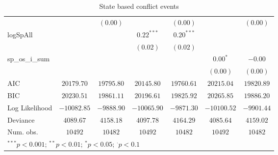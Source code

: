 \begin{sidewaystable}
\begin{center}
{\begin{tabular}{l c c c c c c}
                &               & $(0.00)$      &               & $(0.00)$      &               & $(0.00)$      \\
logSpAll        &               &               & $0.22^{***}$  & $0.20^{***}$  &               &               \\
                &               &               & $(0.02)$      & $(0.02)$      &               &               \\
sp\_os\_i\_sum  &               &               &               &               & $0.00^{*}$    & $-0.00$       \\
                &               &               &               &               & $(0.00)$      & $(0.00)$      \\
\hline
AIC             & $20179.70$    & $19795.80$    & $20145.80$    & $19760.61$    & $20215.04$    & $19820.89$    \\
BIC             & $20230.51$    & $19861.11$    & $20196.61$    & $19825.92$    & $20265.85$    & $19886.20$    \\
Log Likelihood  & $-10082.85$   & $-9888.90$    & $-10065.90$   & $-9871.30$    & $-10100.52$   & $-9901.44$    \\
Deviance        & $4089.67$     & $4158.18$     & $4097.78$     & $4164.29$     & $4085.64$     & $4159.02$     \\
Num. obs.       & $10492$       & $10482$       & $10492$       & $10482$       & $10492$       & $10482$       \\
\hline
\multicolumn{7}{l}{\scriptsize{$^{***}p<0.001$; $^{**}p<0.01$; $^{*}p<0.05$; $^{\cdot}p<0.1$}}
\end{tabular}
}
\caption{State based conflict events}
\label{state_based}
\end{center}
\end{sidewaystable}
